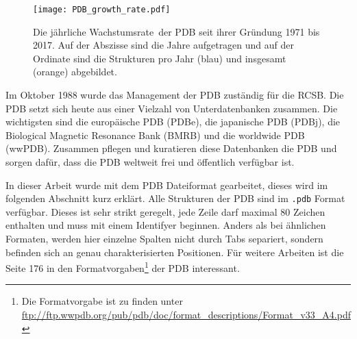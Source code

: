 \begin{figure}
    \centering
    \texttt{[image: PDB\_growth\_rate.pdf]}
    \caption{Die jährliche Wachstumsrate\protect\footnotemark \ der \ac{PDB} seit ihrer Gründung 1971 bis 2017. Auf der Abszisse sind die Jahre aufgetragen und auf der Ordinate sind die Strukturen pro Jahr (blau) und insgesamt (orange) abgebildet.}
    \label{fig:PDB_growth_rate}
\end{figure}

Im Oktober 1988 wurde das Management der \ac{PDB} zuständig für die \ac{RCSB}. Die \ac{PDB} setzt sich heute aus einer Vielzahl von Unterdatenbanken zusammen. Die wichtigsten sind die europäische \ac{PDB} (PDBe), die japanische \ac{PDB} (PDBj), die Biological Magnetic Resonance Bank (BMRB) und die worldwide \ac{PDB} (wwPDB). Zusammen pflegen und kuratieren diese Datenbanken die \ac{PDB} und sorgen dafür, dass die \ac{PDB} weltweit frei und öffentlich verfügbar ist.


In dieser Arbeit wurde mit dem \ac{PDB} Dateiformat gearbeitet, dieses wird im folgenden Abschnitt kurz erklärt. Alle Strukturen der \ac{PDB} sind im \texttt{.pdb} Format verfügbar. Dieses ist sehr strikt geregelt, jede Zeile darf maximal 80 Zeichen enthalten und muss mit einem Identifyer beginnen. Anders als bei ähnlichen Formaten, werden hier einzelne Spalten nicht durch Tabs separiert, sondern befinden sich an genau charakterisierten Positionen. 
Für weitere Arbeiten ist die Seite 176 in den Formatvorgaben\footnote{Die Formatvorgabe ist zu finden unter \url{ftp://ftp.wwpdb.org/pub/pdb/doc/format_descriptions/Format_v33_A4.pdf}} der \ac{PDB} interessant.


